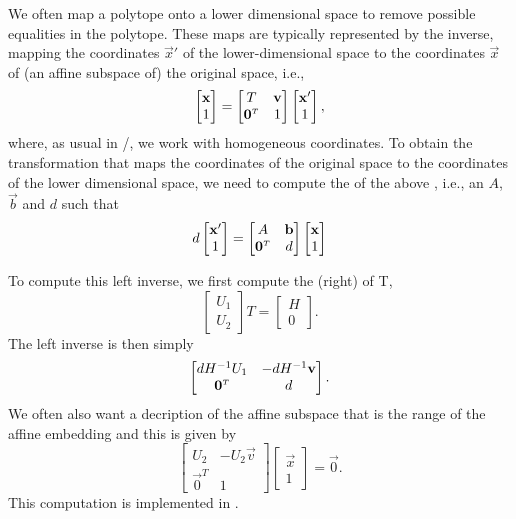 We often map a polytope onto a lower dimensional space to remove possible
equalities in the polytope.  These maps are typically represented
by the inverse, mapping the coordinates $\vec x'$ of the lower-dimensional
space to the coordinates $\vec x$ of (an affine subspace of) the original space,
i.e.,
$$
\begin{bmatrix}
\vec x \\ 1
\end{bmatrix}
=
\begin{bmatrix}
T & \vec v \\ \vec 0^\T & 1
\end{bmatrix}
\begin{bmatrix}
\vec x' \\ 1
\end{bmatrix}
,
$$
where, as usual in \PolyLib/, we work with homogeneous coordinates.
To obtain the transformation that maps the coordinates of the original
space to the coordinates of the lower dimensional space,
we need to compute the  of the above ,
i.e., an $A$, $\vec b$ and $d$ such that
$$
d
\begin{bmatrix}
\vec x' \\ 1
\end{bmatrix}
=
\begin{bmatrix}
A & \vec b \\ \vec 0^\T & d
\end{bmatrix}
\begin{bmatrix}
\vec x \\ 1
\end{bmatrix}
$$

To compute this left inverse, we first compute the
(right)  of T,
$$
\begin{bmatrix}
U_1 \\ U_2
\end{bmatrix}
T
=
\begin{bmatrix}
H \\ 0
\end{bmatrix}
.
$$
The left inverse is then simply
$$
\begin{bmatrix}
d H^{-1}U_1 & -d H^{-1} \vec v \\ \vec 0^\T & d
\end{bmatrix}
.
$$
We often also want a decription of the affine subspace that is the range
of the affine embedding and this is given by
$$
\begin{bmatrix}
U_2 & - U_2 \vec v \\ \vec 0^T & 1
\end{bmatrix}
\begin{bmatrix}
\vec x \\ 1
\end{bmatrix}
=
\vec 0
.
$$
This computation is implemented in .

